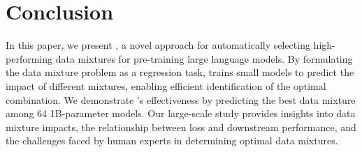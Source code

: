 \vspace{-2mm}
\section{Conclusion}
\vspace{-2mm}

In this paper, we present \ourmethod, a novel approach for automatically selecting high-performing data mixtures for pre-training large language models. By formulating the data mixture problem as a regression task, \ourmethod trains small models to predict the impact of different mixtures, enabling efficient identification of the optimal combination. We demonstrate \ourmethod's effectiveness by predicting the best data mixture among 64 1B-parameter models. Our large-scale study provides insights into data mixture impacts, the relationship between loss and downstream performance, and the challenges faced by human experts in determining optimal data mixtures.
